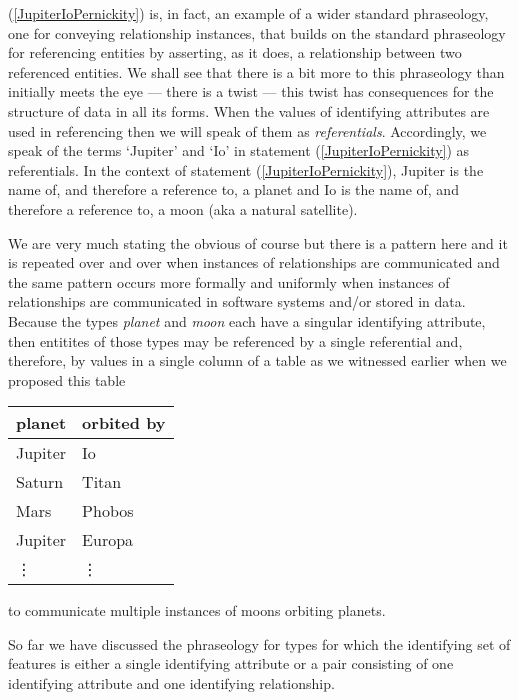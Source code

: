 (\ref{JupiterIoPernickity}) is, in fact, an example of a wider standard phraseology, one  for conveying relationship instances,
that builds on the standard phraseology for referencing entities
by asserting, as it does,  a relationship between two referenced entities.
We shall see that there is a bit more to this phraseology than initially meets the eye --- there is a twist --- this twist has consequences for the structure of data in all its forms.
\mynote
When the values of identifying attributes are used in referencing 
then we will speak of them as \textit{referentials}. 
Accordingly, we speak of the terms `Jupiter' and `Io' in statement (\ref{JupiterIoPernickity}) as referentials.
In the context of statement (\ref{JupiterIoPernickity}), Jupiter is the name of, and therefore  a reference to, a planet and  Io is the name of, and therefore a reference to, a moon (aka a natural satellite).
 
\mynote
We are very much stating the obvious of course but there is a pattern here and it is repeated over and over when instances of relationships are communicated  and the same pattern occurs more formally  and uniformly when instances of relationships are communicated in software systems and/or stored in data.
Because 
the types \textit{planet} and \textit{moon} each have
a singular identifying attribute, then entitites of those types 
may be referenced by a single referential and, therefore, by values in a
single column of a table as we witnessed earlier when we proposed this table
\begin{center}
\begin{tabular}{|l | l|}
\hline
planet & orbited by \\
\hline\hline
Jupiter  & Io \\
\hline
Saturn   & Titan    \\
\hline
Mars     & Phobos    \\
\hline
Jupiter  & Europa         \\
\hline
\vdots    & \vdots  \\
\hline
\end{tabular}
\end{center}
to communicate multiple instances of moons orbiting planets.

\mynote
So far we have discussed the phraseology for  types for which the identifying set of features is either a single identifying attribute or a pair consisting of one identifying attribute and one identifying relationship. 

